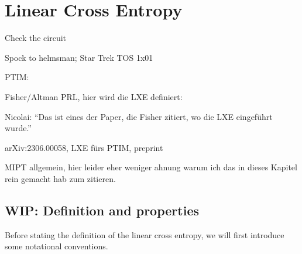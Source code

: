 \chapter{Linear Cross Entropy}
\label{ch:lxe}
\epigraph{Check the circuit}{Spock to helmsman; Star Trek TOS 1x01
\cite{butlerCage1988}}

PTIM: \cite{langEntanglementTransitionProjective2020}

Fisher/Altman PRL, hier wird die LXE definiert: \cite{liCrossEntropyBenchmark2023}

Nicolai: \enquote{Das ist eines der Paper, die Fisher zitiert, wo die LXE eingeführt wurde.} \cite{baoSymmetryEnrichedPhases2021}

arXiv:2306.00058, LXE fürs PTIM, preprint \cite{tikhanovskayaUniversalityCrossEntropy2023}

MIPT allgemein, hier leider eher weniger ahnung warum ich das in dieses Kapitel rein
gemacht hab zum zitieren. \cite{baoTheoryPhaseTransition2020}


\section{WIP: Definition and properties}
Before stating the definition of the linear cross entropy, we will first
introduce some notational conventions.

